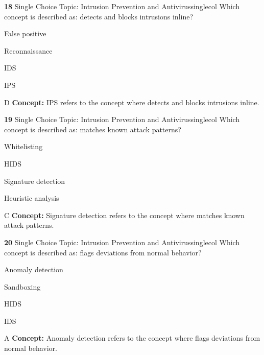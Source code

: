 \documentclass[10pt,a4paper]{article}
\begin{document}
\begin{qcard}{\color{white}\textbf{18} \hfill \small Single Choice \textbar{} Topic: Intrusion Prevention and Antivirus}{singlecol}
Which concept is described as: detects and blocks intrusions inline?

\begin{qoptions}
\item False positive
\item Reconnaissance
\item IDS
\item IPS
\end{qoptions}
\begin{explainbox}{D}
\textbf{Concept:} IPS refers to the concept where detects and blocks intrusions inline.
\end{explainbox}
\end{qcard}

\begin{qcard}{\color{white}\textbf{19} \hfill \small Single Choice \textbar{} Topic: Intrusion Prevention and Antivirus}{singlecol}
Which concept is described as: matches known attack patterns?

\begin{qoptions}
\item Whitelisting
\item HIDS
\item Signature detection
\item Heuristic analysis
\end{qoptions}
\begin{explainbox}{C}
\textbf{Concept:} Signature detection refers to the concept where matches known attack patterns.
\end{explainbox}
\end{qcard}

\begin{qcard}{\color{white}\textbf{20} \hfill \small Single Choice \textbar{} Topic: Intrusion Prevention and Antivirus}{singlecol}
Which concept is described as: flags deviations from normal behavior?

\begin{qoptions}
\item Anomaly detection
\item Sandboxing
\item HIDS
\item IDS
\end{qoptions}
\begin{explainbox}{A}
\textbf{Concept:} Anomaly detection refers to the concept where flags deviations from normal behavior.
\end{explainbox}
\end{qcard}
\end{document}
